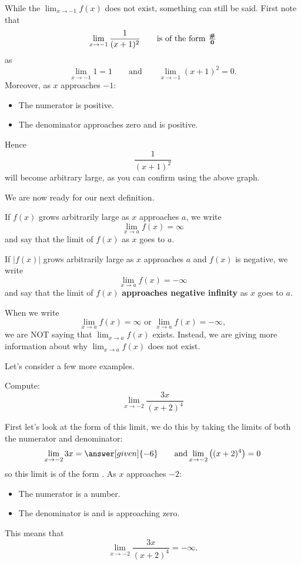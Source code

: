 \documentclass{ximera}
\begin{document}
While the $\lim_{x\to -1} f(x)$ does not exist, something can still be
said. First note that
\[
\lim_{x\to -1} \frac{1}{(x+1)^2}\qquad\text{is of the form }\boldsymbol{\tfrac{\#}{0}}
\]
as
\[
\lim_{x\to -1} 1 = 1 \qquad\text{and}\qquad \lim_{x\to -1}(x+1)^2 = 0.
\]
Moreover, as $x$ approaches $-1$:
\begin{itemize}
\item The numerator is positive.
\item The denominator approaches zero and is positive.
\end{itemize}
Hence
\[
\frac{1}{(x+1)^2}
\]
will become arbitrary large, as you can confirm using the above graph. 

We are now ready for our next definition.

\begin{definition}
If $f(x)$ grows arbitrarily large as $x$ approaches $a$, we write
\[
\lim_{x\to a} f(x) = \infty
\]
and say that the limit of $f(x)$  as $x$
goes to $a$.

If $|f(x)|$ grows arbitrarily large as $x$ approaches $a$ and $f(x)$ is
negative, we write
\[
\lim_{x\to a} f(x) = -\infty
\]
and say that the limit of $f(x)$ \textbf{approaches negative infinity}
as $x$ goes to $a$.
\end{definition}

\begin{warning}
When we write 
\[
\lim_{x\to a} f(x) = \infty \text{ or }
\lim_{x\to a} f(x) = -\infty, 
\]
we are NOT saying that $\lim_{x\to a} f(x)$ exists.  Instead, we are giving more information about why $\lim_{x\to a} f(x)$ does not exist.  
\end{warning}

Let's consider a few more examples.

\begin{example}
  Compute:
  \[
  \lim_{x\to -2} \frac{3x}{(x+2)^4}
  \]
  \begin{explanation}
    First let's look at the form of this limit, we do this by taking the limits of both the numerator and denominator:
    \[
    \lim_{x\to -2} 3x = \answer[given]{-6}\qquad\text{and}\lim_{x\to-2}\left((x+2)^4\right) = 0
    \]
    so this limit is of the form \numOverZero.  As $x$ approaches $-2$:
    \begin{itemize}
    \item The numerator is a  number. 
    \item The denominator is  and is approaching zero.
    \end{itemize}
    This means that
    \[
    \lim_{x\to -2} \frac{3x}{(x+2)^4} = -\infty.
    \]
  \end{explanation}
\end{example}
\end{document}
